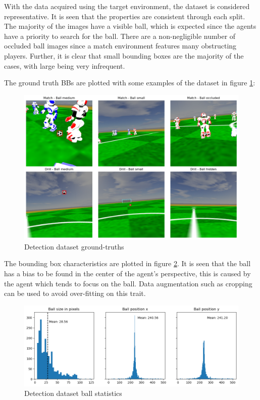 \documentclass[a4paper,twoside,12pt]{report}
\begin{document}
With the data acquired using the target environment, the dataset is considered representative. It is seen that the properties are consistent through each split. The majority of the images have a visible ball, which is expected since the agents have a priority to search for the ball. There are a non-negligible number of occluded ball images since a match environment features many obstructing players. Further, it is clear that small bounding boxes are the majority of the cases, with large being very infrequent. 

The ground truth BBs are plotted with some examples of the dataset in figure \ref{fig:detectimages}:

\begin{figure}[h!]
\begin{center}
\includegraphics[width=16cm]{images/imagedetections.png}
\caption{Detection dataset ground-truths}
\label{fig:detectimages}
\end{center}
\end{figure}

The bounding box characteristics are plotted in figure \ref{fig:detectplot}. It is seen that the ball has a bias to be found in the center of the agent's perspective, this is caused by the agent which tends to focus on the ball. Data augmentation such as cropping can be used to avoid over-fitting on this trait.

\begin{figure}[h!]
\begin{center}
\includegraphics[width=15cm]{images/plotdetections.png}
\caption{Detection dataset ball statistics}
\label{fig:detectplot}
\end{center}
\end{figure}
\end{document}
